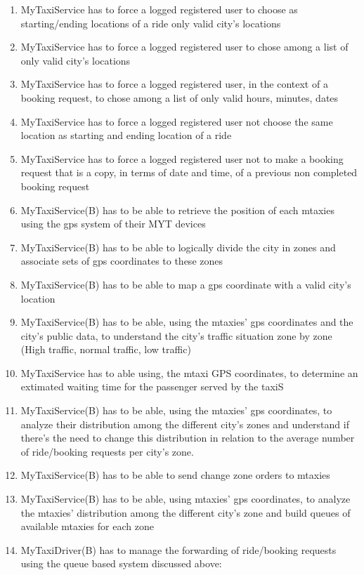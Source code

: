 \documentclass[11pt,titlepage]{article} %
\begin{document}
\begin{enumerate}
	      \item MyTaxiService has to force a logged registered user to choose as starting/ending locations of a ride only valid city's locations
	      \item MyTaxiService has to force a logged registered user to chose among a list of only valid city's locations
	      \item MyTaxiService has to force a logged registered user, in the context of a booking request, to chose among a list of only valid hours, minutes, dates
	      \item MyTaxiService has to force a logged registered user not choose the same location as starting and ending location of a ride
	      \item MyTaxiService has to force a logged registered user not to make a booking request that is a copy, in terms of date and time, of a previous non completed booking request
	      \item MyTaxiService(B) has to be able to retrieve the position of each mtaxies using the gps system of their MYT devices
	      \item MyTaxiService(B) has to be able to logically divide the city in zones and associate sets of gps
	      coordinates to these zones
	      \item MyTaxiService(B) has to be able to map a gps coordinate with a valid city's location
	      \item MyTaxiService(B) has to be able, using the mtaxies' gps coordinates and the city's public data, to understand the
	      city's traffic situation zone by zone (High traffic, normal traffic, low traffic)
	      \item MyTaxiService has to able using, the mtaxi GPS coordinates, to determine an extimated waiting time for the passenger served by the taxiS
	      \item MyTaxiService(B) has to be able, using the mtaxies' gps coordinates, to analyze their
	      distribution among the different city's zones and understand if there's the need to change this
	      distribution in relation to the average number of ride/booking requests per city's zone.
	      \item MyTaxiService(B) has to be able to send change zone orders to mtaxies
	      \item MyTaxiService(B) has to be able, using mtaxies' gps coordinates, to analyze the mtaxies'
	      distribution among the different city's zone and build queues of available mtaxies for each zone
	      \item MyTaxiDriver(B) has to manage the forwarding of ride/booking requests using the queue based system discussed above:

\end{enumerate}
\end{document}
